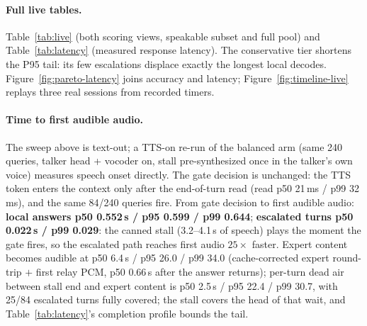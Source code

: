 
\paragraph{Full live tables.} Table~\ref{tab:live} (both scoring views,
speakable subset and full pool) and Table~\ref{tab:latency} (measured
response latency). The conservative tier shortens the P95 tail:
its few escalations displace exactly the longest local decodes.
Figure~\ref{fig:pareto-latency} joins accuracy and latency;
Figure~\ref{fig:timeline-live} replays three real sessions from
recorded timers.

\paragraph{Time to first audible audio.} The sweep above is
text-out; a TTS-on re-run of the balanced arm (same 240 queries,
talker head + vocoder on, stall pre-synthesized once in the talker's
own voice) measures speech onset directly. The gate decision is
unchanged: the TTS token enters the context only after the
end-of-turn read (read p50 21\,ms / p99 32\,ms), and the same
84/240 queries fire. From gate decision to first audible audio:
\textbf{local answers p50 0.552\,s / p95 0.599 / p99 0.644};
\textbf{escalated turns p50 0.022\,s / p99 0.029}: the canned
stall (3.2--4.1\,s of speech) plays the moment the gate fires, so
the escalated path reaches first audio $25\times$ faster. Expert
content becomes audible at p50 6.4\,s / p95 26.0 / p99
34.0 (cache-corrected expert round-trip $+$ first relay PCM, p50
0.66\,s after the answer returns); per-turn dead air between stall
end and expert content is p50 2.5\,s / p95 22.4 / p99 30.7, with
25/84 escalated turns fully covered; the stall covers the head of
that wait, and Table~\ref{tab:latency}'s completion profile bounds
the tail.

